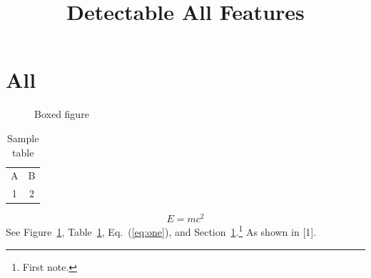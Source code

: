 \documentclass[letterpaper]{article}
\begin{document}
\title{Detectable All Features}\author{}\date{}\maketitle
\section{All}\label{sec:all}
\begin{figure}[h]\centering{}\caption{Boxed figure}\label{fig:one}\end{figure}
\begin{table}[h]\centering\caption{Sample table}\label{tab:one}\begin{tabular}{cc}A & B\\1 & 2\end{tabular}\end{table}
\begin{equation}\label{eq:one}E = mc^2\end{equation}
See Figure~\ref{fig:one}, Table~\ref{tab:one}, Eq.~(\ref{eq:one}), and Section~\ref{sec:all}.\footnote{First note.}
As shown in [1].
\end{document}
